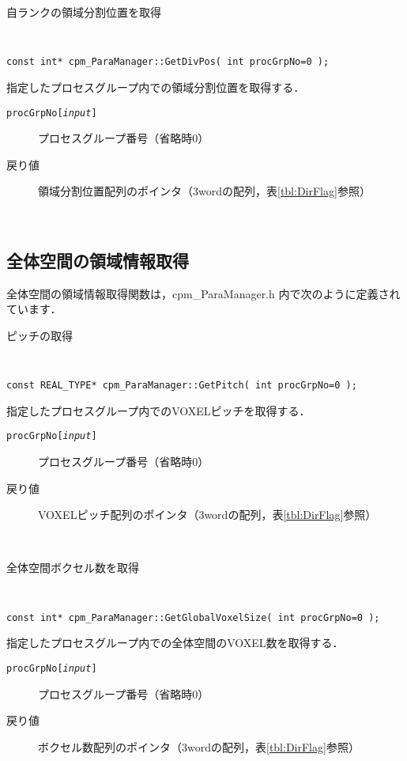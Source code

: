 \begin{spacing}{0.8}
\begin{itembox}[l]{自ランクの領域分割位置を取得}
{\tt
\begin{verbatim}
const int* cpm_ParaManager::GetDivPos( int procGrpNo=0 );
\end{verbatim}
}
指定したプロセスグループ内での領域分割位置を取得する．
\begin{description}
\item[{\tt procGrpNo[{\it input}]}] プロセスグループ番号（省略時0）
\\
\item[戻り値] 領域分割位置配列のポインタ（3wordの配列，表\ref{tbl:DirFlag}参照）
\end{description}
\end{itembox}\\
\end{spacing}


\clearpage


\subsection{全体空間の領域情報取得}
\label{globalInfo}
全体空間の領域情報取得関数は，cpm\_ParaManager.h 内で次のように定義されています．\\

\begin{spacing}{0.8}
\begin{itembox}[l]{ピッチの取得}
{\tt
\begin{verbatim}
const REAL_TYPE* cpm_ParaManager::GetPitch( int procGrpNo=0 );
\end{verbatim}
}
指定したプロセスグループ内でのVOXELピッチを取得する．
\begin{description}
\item[{\tt procGrpNo[{\it input}]}] プロセスグループ番号（省略時0）
\\
\item[戻り値] VOXELピッチ配列のポインタ（3wordの配列，表\ref{tbl:DirFlag}参照）
\end{description}
\end{itembox}\\
\end{spacing}

\begin{spacing}{0.8}
\begin{itembox}[l]{全体空間ボクセル数を取得}
{\tt
\begin{verbatim}
const int* cpm_ParaManager::GetGlobalVoxelSize( int procGrpNo=0 );
\end{verbatim}
}
指定したプロセスグループ内での全体空間のVOXEL数を取得する．
\begin{description}
\item[{\tt procGrpNo[{\it input}]}] プロセスグループ番号（省略時0）
\\
\item[戻り値]ボクセル数配列のポインタ（3wordの配列，表\ref{tbl:DirFlag}参照）
\end{description}
\end{itembox}\\
\end{spacing}

